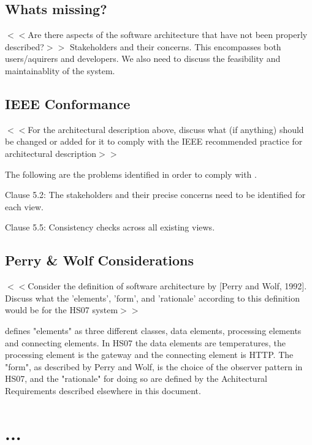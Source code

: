 \documentclass[a4paper,10pt]{article}
\begin{document}
\subsection{Whats missing?}
$<<$Are there aspects of the software architecture that have not been
properly described?$>>$
Stakeholders and their concerns. This encompasses both users/aquirers and developers. We also need to discuss the feasibility and maintainablity of the system. 

\subsection{IEEE Conformance}

$<<$For the architectural description above, discuss what (if anything) should be changed or added for it to comply with the IEEE recommended practice for architectural description$>>$

The following are the problems identified in order to comply with \cite{ieeerecommendedpractice}.

Clause 5.2: The stakeholders and their precise concerns need to be identified for each view. 

Clause 5.5: Consistency checks across all existing views.

\subsection{Perry \& Wolf Considerations}
$<<$Consider the definition of software architecture by [Perry and Wolf, 1992]. Discuss what the 'elements', 'form', and 'rationale' according to this definition would be for the HS07 system$>>$

\cite{perrywolf1992} defines "elements" as three different classes, data elements, processing elements and connecting elements. In HS07 the data elements are temperatures, the processing element is the gateway and the connecting element is HTTP. The "form", as described by Perry and Wolf, is the choice of the observer pattern in HS07, and the "rationale" for doing so are defined by the Achitectural Requirements described elsewhere in this document.

\section{...}



\end{document}
